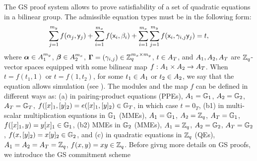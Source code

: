 The GS proof system allows to prove satisfiability of a set of quadratic equations in a bilinear group. The admissible equation types must be in the following form:
\begin{equation}\label{gseq}
\sum_{j=1}^{m_y} f(\alpha_j, \mathsf{y}_j)+\sum_{i=1}^{m_x} f(\mathsf{x}_i, \beta_i)+\sum_{i=1}^{m_x} \sum_{j=1}^{m_y}  f(\mathsf{x}_i,\gamma_{i,j} \mathsf{y}_j)=t,
\end{equation}
 where $\boldsymbol \alpha  \in A_1^{m_y}$, $\boldsymbol \beta  \in A_2^{m_x}$, $\mathbf{{\Gamma}}=(\gamma_{i,j}) \in \mathbb{Z}_q^{m_x\times m_y}$, $t \in A_T$, and $A_1,A_2,A_T$ are $\mathbb{Z}_q$-vector spaces equipped with some bilinear map $f:A_1\times A_2 \rightarrow A_T$. When $t=f(t_1,1)$ or $t=f(1,t_2)$, for some $t_1\in A_1$ or $t_2\in A_2$, we say that the equation allows simulation (see \cite{SIAM:GroSah12}). The modules and the map $f$ can be defined in different ways as: (a) in pairing-product equations (PPEs), $A_1=\mathbb{G}_1$, $A_2=\mathbb{G}_2$, $A_T=\mathbb{G}_T$, $f([x]_1,[y]_2)=e([x]_1,[y]_2) \in \mathbb{G}_T$, in which case $t=0_{T}$, (b1) in multi-scalar multiplication equations in $\mathbb{G}_1$ (MMEs), $A_1=\mathbb{G}_1$, $A_2=\mathbb{Z}_q$, $A_T=\mathbb{G}_1$, $f([x]_1,y)=y [x]_1 \in \mathbb{G}_1$,  (b2) MMEs in $\mathbb{G}_2$ (MMEs),  $A_1=\mathbb{Z}_q$, $A_2=\mathbb{G}_2$, $A_T=\mathbb{G}_2$, $f(x,[y]_2)=x [y]_2 \in \mathbb{G}_2$, and (c) in quadratic equations in $\mathbb{Z}_q$ (QEs), $A_1=A_2=A_T=\mathbb{Z}_q$, $f(x,y)=xy \in \mathbb{Z}_q$. 
Before givng more details on GS proofs, we introduce the GS commitment scheme


